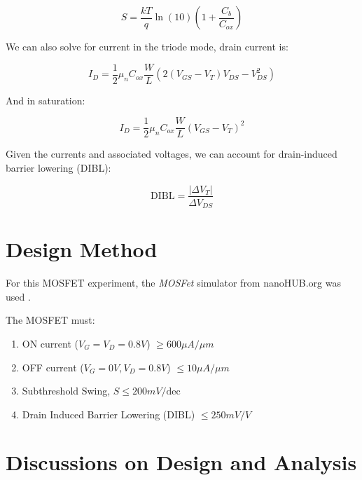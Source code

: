 \documentclass{IEEEtran}
\begin{document}
\begin{equation*}
    S = \frac{kT}{q} \ln (10) \left( 1 + \frac{C_b}{C_{ox}}  \right)
\end{equation*}

We can also solve for current in the triode mode, drain current is:

\begin{equation*}
    I_D = \frac{1}{2} \mu_n C_{ox} \frac{W}{L} (2(V_{GS} - V_T)V_{DS} - V_{DS}^2)
\end{equation*}

And in saturation:

\begin{equation*}
    I_D = \frac{1}{2} \mu_n C_{ox} \frac{W}{L} (V_{GS} - V_T)^2
\end{equation*}

Given the currents and associated voltages, we can account for drain-induced barrier lowering (DIBL):

\begin{equation*}
    \text{DIBL} = \frac{|\Delta V_T|}{\Delta V_{DS}}
\end{equation*}

\section{Design Method}

For this MOSFET experiment, the \textit{MOSFet} simulator from nanoHUB.org was used \cite{sim}.

The MOSFET must:
\begin{enumerate}
    \item ON current (\(V_G = V_D = 0.8V\)) \(\geq 600 \mu A/ \mu m\)\\
    \item OFF current (\(V_G = 0V, V_D = 0.8V\)) \(\leq 10 \mu A / \mu m\) \\
    \item Subthreshold Swing, \(S \leq 200 mV/\text{dec}\) \\
    \item Drain Induced Barrier Lowering (DIBL) \(\leq 250 mV/V\)
\end{enumerate}

\section{Discussions on Design and Analysis}
\end{document}
